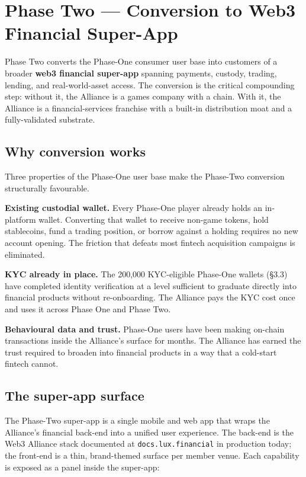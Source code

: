 \section{Phase Two --- Conversion to Web3 Financial Super-App}

Phase Two converts the Phase-One consumer user base into customers of a
broader \textbf{web3 financial super-app} spanning payments, custody,
trading, lending, and real-world-asset access. The conversion is the
critical compounding step: without it, the Alliance is a games company
with a chain. With it, the Alliance is a financial-services franchise
with a built-in distribution moat and a fully-validated substrate.

\subsection{Why conversion works}

Three properties of the Phase-One user base make the Phase-Two
conversion structurally favourable.

\textbf{Existing custodial wallet.} Every Phase-One player already holds
an in-platform wallet. Converting that wallet to receive non-game tokens,
hold stablecoins, fund a trading position, or borrow against a holding
requires no new account opening. The friction that defeats most fintech
acquisition campaigns is eliminated.

\textbf{KYC already in place.} The 200,000 KYC-eligible Phase-One wallets
(\S 3.3) have completed identity verification at a level sufficient to
graduate directly into financial products without re-onboarding. The
Alliance pays the KYC cost once and uses it across Phase One and Phase
Two.

\textbf{Behavioural data and trust.} Phase-One users have been making
on-chain transactions inside the Alliance's surface for months. The
Alliance has earned the trust required to broaden into financial products
in a way that a cold-start fintech cannot.

\subsection{The super-app surface}

The Phase-Two super-app is a single mobile and web app that wraps the
Alliance's financial back-end into a unified user experience. The
back-end is the Web3 Alliance stack documented at \texttt{docs.lux.financial}
in production today; the front-end is a thin, brand-themed surface per
member venue. Each capability is exposed as a panel inside the super-app:

